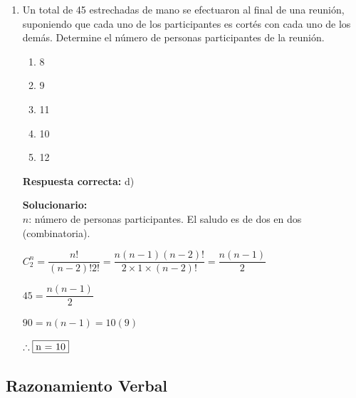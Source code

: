 \begin{enumerate}
	\vspace{6mm}
	
	
	
	\item Un total de 45 estrechadas de mano se efectuaron al final de una reunión, suponiendo que cada uno de los participantes es cortés con cada uno de los demás. Determine el número de personas participantes de la reunión.
	\begin{enumerate}[label=\alph*)]
		\item 8
		\item 9
		\item 11
		\item 10
		\item 12
	\end{enumerate}
	\textbf{Respuesta correcta:} d)
	
	\vspace{2mm}
	\textbf{Solucionario:}\\
	$n$: número de personas participantes. El saludo es de dos en dos (combinatoria).
	
	$ C_{2}^{n} = \dfrac{n!}{(n-2)! 2!} = \dfrac{n(n-1)(n-2)!}{2 \times 1 \times (n-2)!} = \dfrac{n(n-1)}{2} $
	
	$ 45 = \dfrac{n(n-1)}{2} $
	
	$ 90 = n(n-1) = 10(9) $
	
	$\therefore  \fbox{n = 10}$
	
	\vspace{6mm}
	
	
	
\end{enumerate}









\subsection*{Razonamiento Verbal}

